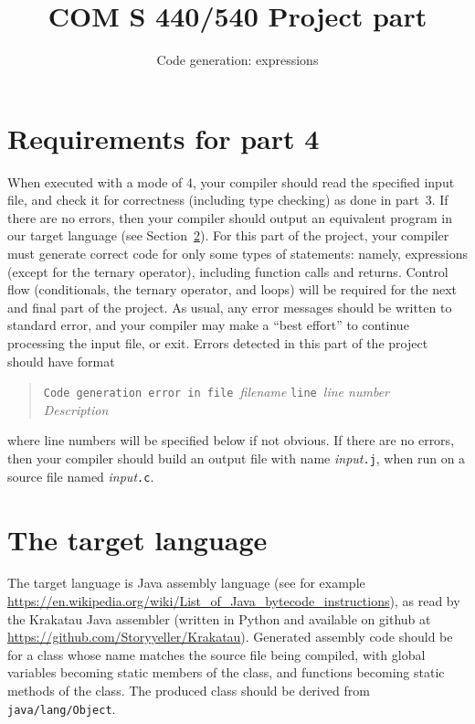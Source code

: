 \documentclass{article}
\title{COM S 440/540 Project part \codegen}
\author{Code generation: expressions}
\date{}
\newcommand{\typecheck}{3}
\newcommand{\codegen}{4}
\begin{document}
\maketitle

\section{Requirements for part \codegen}

When executed with a mode of \codegen,
your compiler should read the specified input file,
and check it for correctness (including type checking) as done in part~\typecheck.
If there are no errors, then your compiler should output
an equivalent program in our target language
(see Section~\ref{SEC:target}).
For this part of the project,
your compiler must generate correct code for only some types of
statements:
namely, expressions (except for the ternary operator),
including function calls and returns.
Control flow (conditionals, the ternary operator, and loops)
will be required for the next and final part of the project.
As usual,
any error messages should be written to standard error,
and your compiler may make a ``best effort'' to continue processing
the input file, or exit.
Errors detected in this part of the project should have format
\begin{quote}
  \begin{tabbing}
		{\tt Code ge}\={\tt neration error in file }\emph{filename}
		{\tt line }\emph{line number}
	\\
		\> \emph{Description}
  \end{tabbing}
\end{quote}
where line numbers will be specified below if not obvious.
If there are no errors, then your compiler should build an output file
with name \emph{input}{\tt .j},
when run on a source file named \emph{input}{\tt .c}.


\section{The target language} \label{SEC:target}

The target language is Java assembly language
(see for example \url{https://en.wikipedia.org/wiki/List_of_Java_bytecode_instructions}),
as read by the Krakatau Java assembler
(written in Python and available on github at
\url{https://github.com/Storyyeller/Krakatau}).
Generated assembly code should be for a class whose name
matches the source file being compiled,
with global variables becoming static members of the class,
and functions becoming static methods of the class.
The produced class should be derived from {\tt java/lang/Object}.
\end{document}
